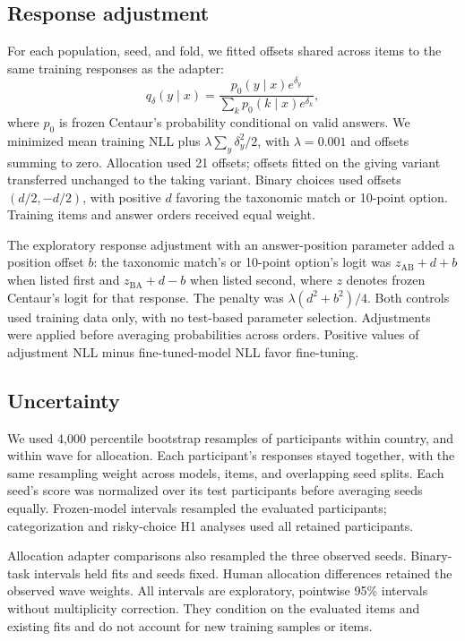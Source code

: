 \subsection{Response adjustment}

For each population, seed, and fold, we fitted offsets shared across items to the same training responses as the adapter:
\[
q_{\delta}(y\mid x)=\frac{p_0(y\mid x)e^{\delta_y}}{\sum_k p_0(k\mid x)e^{\delta_k}},
\]
where $p_0$ is frozen Centaur's probability conditional on valid answers. We minimized mean training NLL plus $\lambda\sum_y\delta_y^2/2$, with $\lambda=0.001$ and offsets summing to zero. Allocation used 21 offsets; offsets fitted on the giving variant transferred unchanged to the taking variant. Binary choices used offsets $(d/2,-d/2)$, with positive $d$ favoring the taxonomic match or 10-point option. Training items and answer orders received equal weight.

The exploratory response adjustment with an answer-position parameter added a position offset $b$: the taxonomic match's or 10-point option's logit was $z_{\mathrm{AB}}+d+b$ when listed first and $z_{\mathrm{BA}}+d-b$ when listed second, where $z$ denotes frozen Centaur's logit for that response. The penalty was $\lambda(d^2+b^2)/4$. Both controls used training data only, with no test-based parameter selection. Adjustments were applied before averaging probabilities across orders. Positive values of adjustment NLL minus fine-tuned-model NLL favor fine-tuning.

\subsection{Uncertainty}

We used 4,000 percentile bootstrap resamples of participants within country, and within wave for allocation. Each participant's responses stayed together, with the same resampling weight across models, items, and overlapping seed splits. Each seed's score was normalized over its test participants before averaging seeds equally. Frozen-model intervals resampled the evaluated participants; categorization and risky-choice H1 analyses used all retained participants.

Allocation adapter comparisons also resampled the three observed seeds. Binary-task intervals held fits and seeds fixed. Human allocation differences retained the observed wave weights. All intervals are exploratory, pointwise 95\% intervals without multiplicity correction. They condition on the evaluated items and existing fits and do not account for new training samples or items.


